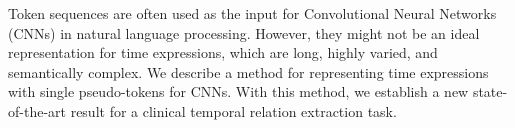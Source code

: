 Token sequences are often used as the input for Convolutional Neural Networks (CNNs) in natural language processing. However, they might not be an ideal representation for time expressions, which are long, highly varied, and semantically complex. We describe a method for representing time expressions with single pseudo-tokens for CNNs. With this method, we establish a new state-of-the-art result for a clinical temporal relation extraction task.
